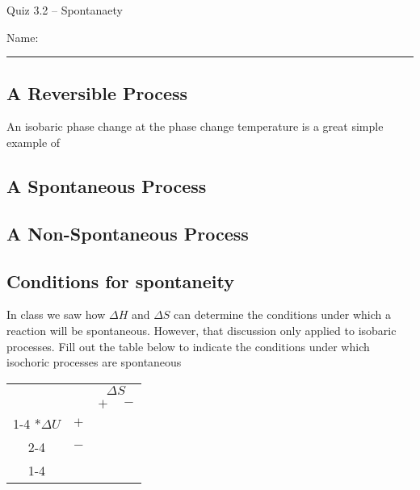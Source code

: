 \documentclass[11pt, letterpaper]{memoir}
\begin{document}
	\begin{center}
		{\large Quiz 3.2 -- Spontanaety}
	\end{center}
	{\large Name: \rule[-1mm]{4in}{.1pt} 
		
\subsection*{A Reversible Process}

An isobaric phase change at the phase change temperature is a great simple example of 

\subsection*{A Spontaneous Process}

\subsection*{A Non-Spontaneous Process}

\subsection*{Conditions for spontaneity}
In class we saw how $\Delta H$ and $\Delta S$ can determine the conditions under which a reaction will be spontaneous. However, that discussion only applied to isobaric processes. Fill out the table below to indicate the conditions under which isochoric processes are spontaneous

\begin{center}
	\begin{tabular}{cc|c|c|}
		&&\multicolumn{2}{c|}{$\Delta S$} \\
		&& $+$ & $-$ \\ \cline{1-4}
		\multirow{2}*{$\Delta U$} &$+$&~\hspace{8em}~& ~\hspace{8em}~\\  \cline{2-4}
		&$-$&& \\ \cline{1-4}
		
	\end{tabular}
\end{center}
\newpage
\pagestyle{empty}
\addtocounter{page}{-1}
%

}
\end{document}
